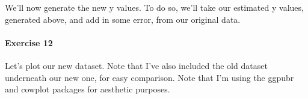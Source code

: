 \documentclass[]{article}
\newenvironment{Shaded}{\begin{snugshade}}{\end{snugshade}}
\newcommand{\KeywordTok}[1]{\textcolor[rgb]{0.13,0.29,0.53}{\textbf{#1}}}
\newcommand{\DecValTok}[1]{\textcolor[rgb]{0.00,0.00,0.81}{#1}}
\newcommand{\StringTok}[1]{\textcolor[rgb]{0.31,0.60,0.02}{#1}}
\newcommand{\CommentTok}[1]{\textcolor[rgb]{0.56,0.35,0.01}{\textit{#1}}}
\newcommand{\OperatorTok}[1]{\textcolor[rgb]{0.81,0.36,0.00}{\textbf{#1}}}
\newcommand{\NormalTok}[1]{#1}
\let\oldparagraph\paragraph
\renewcommand{\paragraph}[1]{\oldparagraph{#1}\mbox{}}
\begin{document}
We'll now generate the new y values. To do so, we'll take our estimated
y values, generated above, and add in some error, from our original
data.

\begin{Shaded}
\end{Shaded}

\paragraph{Exercise 12}\label{exercise-12}

Let's plot our new dataset. Note that I've also included the old dataset
underneath our new one, for easy comparison. Note that I'm using the
ggpubr and cowplot packages for aesthetic purposes.
\end{document}
